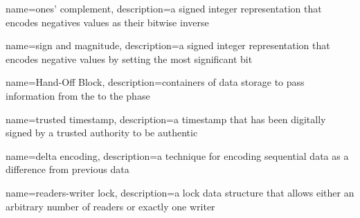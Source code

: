 {
  name={ones' complement},
  description={a signed integer representation that encodes negatives values as their bitwise inverse}
}

{
  name={sign and magnitude},
  description={a signed integer representation that encodes negative values by setting the most significant bit}
}

{
  name={Hand-Off Block},
  description={containers of data storage to pass information from the  to the  phase}
}

{
  name={trusted timestamp},
  description={a timestamp that has been digitally signed by a trusted authority to be authentic}
}

{
  name={delta encoding},
  description={a technique for encoding sequential data as a difference from previous data}
}

{
  name={readers-writer lock},
  description={a lock data structure that allows either an arbitrary number of readers or exactly one writer}
}
